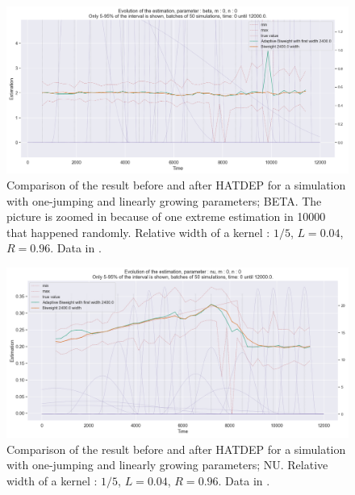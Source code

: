 \begin{figure}
\centering
\includegraphics[width = 0.90 \textwidth]{../imag/chap3/3_bis/Q.png}
\caption{Comparison of the result before and after HATDEP for a simulation with one-jumping and linearly growing parameters; BETA. The picture is zoomed in because of one extreme estimation in 10000 that happened randomly. Relative width of a kernel : $1/5$, $L = 0.04$, $R = 0.96$. Data in \protect {}.}
\label{fig:second_estimate_3_beta}
\end{figure}

\begin{figure}
\centering
\includegraphics[width = 0.90 \textwidth]{../imag/chap3/3_bis/R.png}
\caption{Comparison of the result before and after HATDEP for a simulation with one-jumping and linearly growing parameters; NU. Relative width of a kernel : $1/5$, $L = 0.04$, $R = 0.96$. Data in \protect {}.}
\label{fig:second_estimate_3_nu}
\end{figure}




